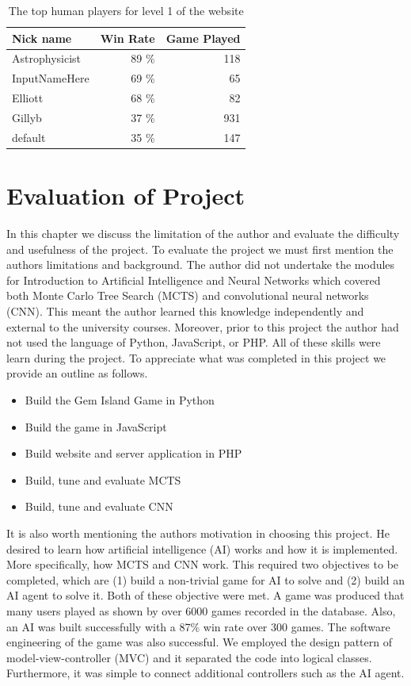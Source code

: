 \documentclass{bhamthesis}
\theoremstyle{definition}
\begin{document}
\begin{table}[]
	\centering
	\caption{The top human players for level 1 of the website}
	\label{t:humanWinRates}
	\begin{tabular}{lrr}
		\hline
		Nick name      & Win Rate & Game Played \\ \hline
		Astrophysicist & 89 \%    & 118         \\
		InputNameHere  & 69 \%    & 65          \\
		Elliott        & 68 \%    & 82          \\
		Gillyb         & 37 \%    & 931         \\
		default        & 35 \%    & 147        
	\end{tabular}
\end{table}


\chapter{Evaluation of Project}
In this chapter we discuss the limitation of the author and evaluate the difficulty and usefulness of the project.
To evaluate the project we must first mention the authors limitations and background. The author did not undertake the modules for Introduction to Artificial Intelligence and Neural Networks which covered both Monte Carlo Tree Search (MCTS) and convolutional neural networks (CNN). This meant the author learned this knowledge independently and external to the university courses. Moreover, prior to this project the author had not used the language of Python, JavaScript, or PHP. All of these skills were learn during the project.
To appreciate what was completed in this project we provide an outline as follows.
\begin{itemize}
	\item Build the Gem Island Game in Python
	\item Build the game in JavaScript
	\item Build website and server application in PHP
	\item Build, tune and evaluate MCTS
	\item Build, tune and evaluate CNN
\end{itemize}

It is also worth mentioning the authors motivation in choosing this project. He desired to learn how artificial intelligence (AI) works and how it is implemented. More specifically, how MCTS and CNN work. This required two objectives to be completed, which are (1) build a non-trivial game for AI to solve and (2) build an AI agent to solve it. Both of these objective were met. A game was produced that many users played as shown by over 6000 games recorded in the database. Also, an AI was built successfully with a 87\% win rate over 300 games. 
The software engineering of the game was also successful. We employed the design pattern of model-view-controller (MVC) and it separated the code into logical classes. Furthermore, it was simple to connect additional controllers such as the AI agent.
\end{document}
